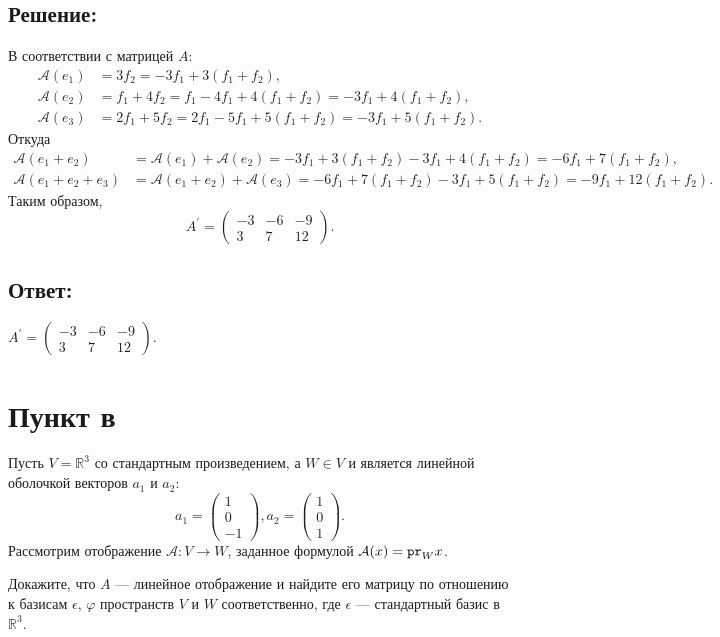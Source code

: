 \documentclass[12pt]{article}
\begin{document}
    \subsection*{Решение:}
    В соответствии с матрицей $A$:
    \begin{align*}
        \mathcal{A}(e_1) &
        = 3 f_2
        = - 3 f_1 + 3 ( f_1 + f_2 ), \\
        \mathcal{A}(e_2) &
        = f_1 + 4 f_2
        = f_1 - 4 f_1 + 4 ( f_1 + f_2 )
        = -3 f_1 + 4 ( f_1 + f_2 ), \\
        \mathcal{A}(e_3) &
        = 2 f_1 + 5 f_2
        = 2 f_1 - 5 f_1 + 5 ( f_1 + f_2 )
        = -3 f_1 + 5 ( f_1 + f_2 ) .
    \end{align*}
    Откуда
    \begin{align*}
        \mathcal{A}(e_1 + e_2) &
        = \mathcal{A}(e_1) + \mathcal{A}(e_2)
        = - 3 f_1 + 3 ( f_1 + f_2 ) - 3 f_1 + 4 ( f_1 + f_2 )
        = - 6 f_1 + 7 ( f_1 + f_2 ), \\
        \mathcal{A}(e_1 + e_2 + e_3) &
        = \mathcal{A}(e_1 + e_2) + \mathcal{A}(e_3)
        = - 6 f_1 + 7 ( f_1 + f_2 ) - 3 f_1 + 5 ( f_1 + f_2 )
        = - 9 f_1 + 12 ( f_1 + f_2 ) .
    \end{align*}
    Таким образом,
    \[
        A^{\prime}
        =
        \begin{pmatrix}
            -3 & -6 & -9 \\
            3  & 7  & 12
        \end{pmatrix}
        .
    \]

    \subsection*{Ответ:}
    $
    A^{\prime}
    =
    \begin{pmatrix}
        -3 & -6 & -9 \\
        3  & 7  & 12
    \end{pmatrix}
    $.

    \section*{Пункт в}
    Пусть $V = \mathbb{R}^3$ со стандартным произведением, а $W \in V$ и является линейной оболочкой векторов $a_1$ и $a_2$:
    \[
        a_1 = \begin{pmatrix}
                  1 \\ 0 \\ -1
        \end{pmatrix},
        a_2 = \begin{pmatrix}
                  1 \\ 0 \\ 1
        \end{pmatrix}
        .
    \]
    Рассмотрим отображение $\mathcal{A}: V \rightarrow W$, заданное формулой $\mathcal{A}(x) = \texttt{pr}_{W} {x}$.

    Докажите, что $A$ --- линейное отображение и найдите его матрицу по отношению к базисам $\epsilon$, $\varphi$ пространств $V$ и $W$ соответственно, где $\epsilon$ ---
    стандартный базис в $\mathbb{R}^3$.
\end{document}
